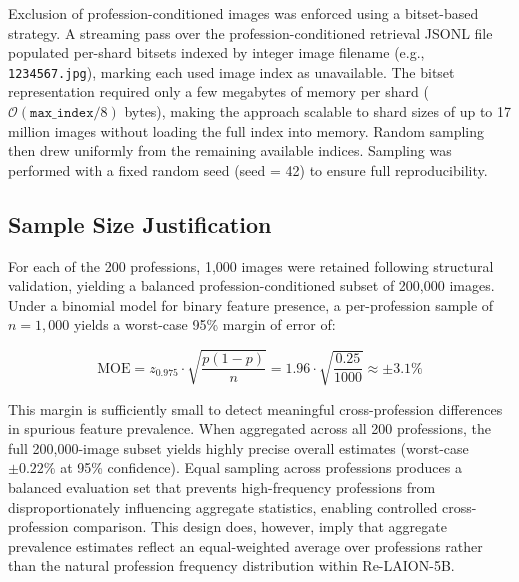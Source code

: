 Exclusion of profession-conditioned images was enforced using a bitset-based strategy. A streaming pass over the profession-conditioned retrieval JSONL file populated per-shard bitsets indexed by integer image filename (e.g., \texttt{1234567.jpg}), marking each used image index as unavailable. The bitset representation required only a few megabytes of memory per shard ($\mathcal{O}(\texttt{max\_index} / 8)$ bytes), making the approach scalable to shard sizes of up to 17 million images without loading the full index into memory. Random sampling then drew uniformly from the remaining available indices. Sampling was performed with a fixed random seed (seed = 42) to ensure full reproducibility.

\subsection{Sample Size Justification}

For each of the 200 professions, 1{,}000 images were retained following structural validation, yielding a balanced profession-conditioned subset of 200{,}000 images. Under a binomial model for binary feature presence, a per-profession sample of $n = 1{,}000$ yields a worst-case 95\% margin of error of:

\[
\text{MOE} = z_{0.975} \cdot \sqrt{\frac{p(1-p)}{n}} = 1.96 \cdot \sqrt{\frac{0.25}{1000}} \approx \pm 3.1\%
\]

This margin is sufficiently small to detect meaningful cross-profession differences in spurious feature prevalence. When aggregated across all 200 professions, the full 200{,}000-image subset yields highly precise overall estimates (worst-case $\pm 0.22\%$ at 95\% confidence). Equal sampling across professions produces a balanced evaluation set that prevents high-frequency professions from disproportionately influencing aggregate statistics, enabling controlled cross-profession comparison. This design does, however, imply that aggregate prevalence estimates reflect an equal-weighted average over professions rather than the natural profession frequency distribution within Re-LAION-5B.








\graphicspath{{content/chapters/3_methodology/figures/}}


